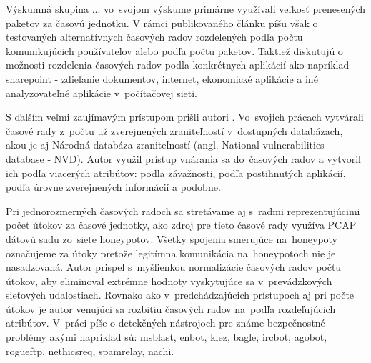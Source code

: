 \documentclass[thesismargins, thesislinespacing, openright, upjsfrontpage]{rnthesis}
\begin{document}
Výskumná skupina ... vo~svojom výskume \cite{jiang2004detecting}  primárne využívali veľkosť prenesených paketov za časovú jednotku. V rámci publikovaného článku píšu však o testovaných alternatívnych časových radov rozdelených podľa počtu komunikujúcich používateľov alebo podľa počtu paketov. Taktiež diskutujú o možnosti rozdelenia časových radov podľa konkrétnych aplikácií ako napríklad sharepoint - zdieľanie dokumentov, internet, ekonomické aplikácie a iné analyzovateľné aplikácie v~počítačovej sieti.

S ďalším veľmi zaujímavým prístupom prišli autori \cite{tang2016exploiting,roumani2015time,tang2018disclosure,tang2017big,pokhrel2017cybersecurity,werner2017time}. Vo~svojich prácach vytvárali časové rady z~počtu už zverejnených zraniteľností v~dostupných databázach, akou je aj Národná databáza zraniteľností (angl. National vulnerabilities database - NVD). Autor \cite{roumani2015time} využil prístup vnárania sa do~časových radov a vytvoril ich podľa viacerých atribútov: podla závažnosti, podľa postihnutých aplikácií, podľa úrovne zverejnených informácií a podobne.

Pri jednorozmerných časových radoch sa stretávame aj s~radmi reprezentujúcimi počet útokov za časové jednotky, \cite{zhan2015predicting} ako zdroj pre tieto časové rady využíva PCAP dátovú sadu zo~siete honeypotov. Všetky spojenia smerujúce na~honeypoty označujeme za útoky pretože legitímna komunikácia na~honeypotoch nie je nasadzovaná. Autor \cite{fang2019deep} prispel s~myšlienkou normalizácie časových radov počtu útokov, aby eliminoval extrémne hodnoty vyskytujúce sa v~prevádzkových sieťových udalostiach. Rovnako ako v~predchádzajúcich prístupoch aj pri počte útokov je autor \cite{condon2008analysis} venujúci sa rozbitiu časových radov na~podľa rozdeľujúcich atribútov. V~práci píše o detekčných nástrojoch pre známe bezpečnostné problémy akými napríklad sú: msblast, enbot, klez,  bagle, ircbot, agobot, rogueftp, nethicsreq, spamrelay, nachi.
\end{document}
